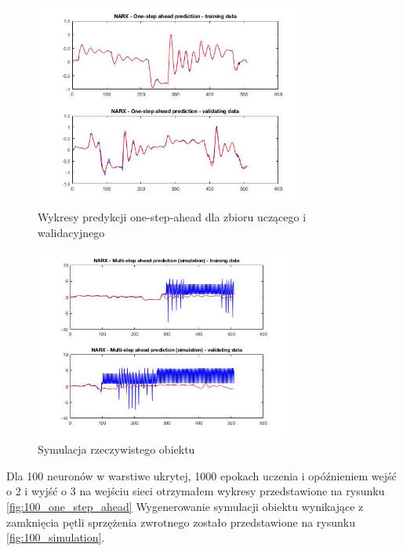 \documentclass{article}
\begin{document}
\begin{figure}[H]
\centering
	\includegraphics[width=0.80\textwidth, keepaspectratio]{10_one_step_ahead}
\caption{Wykresy predykcji one-step-ahead dla zbioru uczącego i walidacyjnego}
		\label{fig:10_one_step_ahead}
\end{figure}
\begin{figure}[H]
\centering
	\includegraphics[width=0.75\textwidth, keepaspectratio]{10_simulation}
\caption{Symulacja rzeczywistego obiektu}
		\label{fig:10_simulation}
\end{figure}


Dla 100 neuronów w warstiwe ukrytej, 1000 epokach uczenia i opóźnieniem
wejść o 2 i wyjść o 3 na wejściu sieci otrzymałem wykresy przedstawione
na rysunku \ref{fig:100_one_step_ahead}
Wygenerowanie symulacji obiektu wynikające z zamknięcia pętli sprzężenia zwrotnego
zostało przedstawione na rysunku \ref{fig:100_simulation}.
\end{document}
